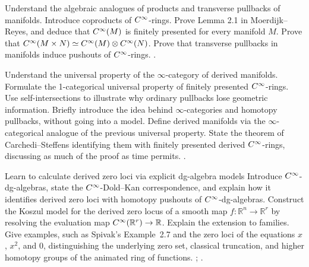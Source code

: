 \documentclass[11pt,a4paper]{book}
\begin{document}
{Understand the algebraic analogues of products and transverse pullbacks of manifolds.}
{Introduce coproducts of $C^\infty$-rings. Prove Lemma 2.1 in Moerdijk--Reyes, and deduce that $C^\infty(M)$ is finitely presented for every manifold $M$. Prove that $C^\infty(M\times N) \simeq C^\infty(M) \otimes C^\infty(N)$. Prove that transverse pullbacks in manifolds induce pushouts of $C^\infty$-rings.}
{\textcite[Chapter~I, Section~2]{Moerdijk_Reyes_Smooth_Infinitesimal_Analysis}.}

{Understand the universal property of the $\infty$-category of derived manifolds.}
{Formulate the 1-categorical universal property of finitely presented $C^\infty$-rings. Use self-intersections to illustrate why ordinary pullbacks lose geometric information. Briefly introduce the idea behind $\infty$-categories and homotopy pullbacks, without going into a model. Define derived manifolds via the $\infty$-categorical analogue of the previous universal property. State the theorem of Carchedi--Steffens identifying them with finitely presented derived $C^\infty$-rings, discussing as much of the proof as time permits.}
{\textcite{Carchedi_Steffens_Universal_Derived_Manifolds}.}

{Learn to calculate derived zero loci via explicit dg-algebra models}
{Introduce $C^\infty$-dg-algebras, state the $C^\infty$-Dold--Kan correspondence, and explain how it identifies derived zero loci with homotopy pushouts of $C^\infty$-dg-algebras. Construct the Koszul model for the derived zero locus of a smooth map $f\colon\mathbb R^n\to\mathbb R^r$ by resolving the evaluation map $C^\infty(\mathbb R^r)\to\mathbb R$. Explain the extension to families. Give examples, such as Spivak's Example~2.7 and the zero loci of the equations $x$, $x^2$, and $0$, distinguishing the underlying zero set, classical truncation, and higher homotopy groups of the animated ring of functions.}
{\textcite[Definition~3.3.1, Theorem~3.3.12, and Examples~3.3.16--3.3.17]{Steffens_Derived_Cinfty_Geometry_I};
	\textcite[Example~2.7]{Spivak_Derived_Smooth_Manifolds}.}
\end{document}
